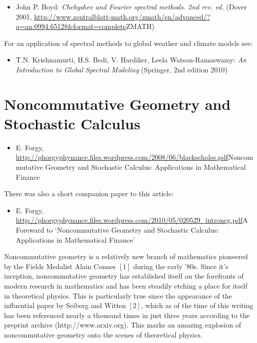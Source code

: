 \documentclass[preprint, 5p, 10pt]{elsarticle}
\theoremstyle{plain}
\begin{document}
\begin{itemize}%
\item John P. Boyd: \emph{Chebyshev and Fourier spectral methods. 2nd rev. ed.} (Dover 2001, \url{http://www.zentralblatt-math.org/zmath/en/advanced/?q=an:0994.65128&format=complete}{ZMATH})

\end{itemize}
For an application of spectral methods to global weather and climate models see:

\begin{itemize}%
\item T.N. Krishnamurti, H.S. Bedi, V. Hardiker, Leela Watson-Ramaswamy: \emph{An Introduction to Global Spectral Modeling} (Springer, 2nd edition 2010)

\end{itemize}
\section{Noncommutative Geometry and Stochastic Calculus}

\begin{itemize}%
\item E. Forgy, \url{http://phorgyphynance.files.wordpress.com/2008/06/blackscholes.pdf}{Noncommutative Geometry and Stochastic Calculus: Applications in Mathematical Finance}

\end{itemize}
There was also a short companion paper to this article:

\begin{itemize}%
\item E. Forgy, \url{http://phorgyphynance.files.wordpress.com/2010/05/020529_introncg.pdf}{A Foreward to `{}Noncommutative Geometry and Stochastic Calculus: Applications in Mathematical Finance'{}}

\end{itemize}


Noncommutative geometry is a relatively new branch of mathematics pioneered by the Fields Medalist Alain Connes $[1]$
 during the early '{}80s. Since it'{}s inception, noncommutative geometry has established itself on the forefronts of modern 
research in mathematics and has been steadily etching a place for itself in theoretical physics. 
This is particularly true since the appearance of the influential paper by Seiberg and Witten $[2]$,
 which as of the time of this writing has been referenced nearly a thousand times in just three years according to the
 preprint archive (http://www.arxiv.org). This marks an amazing explosion of noncommutative geometry onto the scenes of 
theoretical physics.
\end{document}
